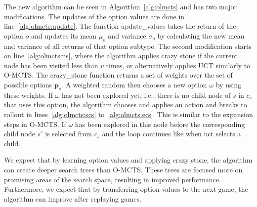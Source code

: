 The new algorithm can be seen in Algorithm~\ref{alg:olmcts} and has two major
modifications. The updates of the option values are done in
line~\ref{alg:olmcts:update}. The function \textsf{update\_values} takes the
return of the option $o$ and updates its mean $\mu_o$ and variance $\sigma_o$ by
calculating the new mean and variance of all returns of that option subtype. The
second modification starts on line~\ref{alg:olmcts:ns}, where the algorithm
applies crazy stone if the current node has been visited less than $v$ times, or
alternatively applies UCT similarly to O-MCTS\@. The \textsf{crazy\_stone}
function returns a set of weights over the set of possible options
$\mathbf{p}_s$. A weighted random then chooses a new option $\omega$ by using
these weights.  If $\omega$ has not been explored yet, i.e., there is no child
node of $s$ in $c_s$ that uses this option, the algorithm chooses and applies an
action and breaks to rollout in lines~\ref{alg:olmcts:scs}
to~\ref{alg:olmcts:ecs}. This is similar to the expansion steps in O-MCTS\@. If
$\omega$ has been explored in this node before the corresponding child node $s'$
is selected from $c_s$ and the loop continues like when \textsf{uct} selects a
child.

We expect that by learning option values and applying crazy stone, the algorithm
can create deeper search trees than O-MCTS\@. These trees are focused more on
promising areas of the search space, resulting in improved performance.
Furthermore, we expect that by transferring option values to the next game, the
algorithm can improve after replaying games.
